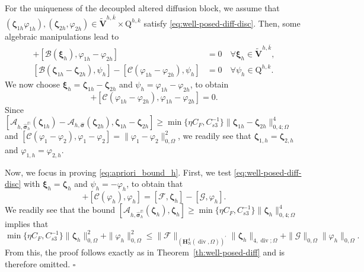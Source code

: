 \documentclass[fleqn,a4paper]{cas-sc}
\newcommand\vdiv{\mathop{\mathrm{div}}\nolimits}
\newcommand{\bxi}{\boldsymbol{\xi}}
\newcommand{\bzeta}{\boldsymbol{\zeta}}
\newcommand{\0}{\boldsymbol{0}}
\newcommand\cC{\mathcal{C}}
\newcommand\cG{\mathcal{G}}
\newcommand\cF{\mathcal{F}}
\newcommand\bV{\mathbf{V}}
\newcommand\rQ{\mathrm{Q}}
\newcommand\bH{\mathbf{H}}
\newcommand\bbPi{\mathbb{\Pi}}
\newcommand\bsigma{\boldsymbol{\sigma}}
\numberwithin{equation}{section}
\numberwithin{figure}{section}
\newenvironment{proof}{\noindent{\it Proof.}}{\hfill$\square$}
\begin{document}
\begin{proof}
    {For the uniqueness of the decoupled altered diffusion block, we assume that $(\bzeta_{1h} \varphi_{1h}), (\bzeta_{2h}, \varphi_{2h})\in \widetilde{\bV}^{h,\overline{k}}\times \rQ^{h,k}$ satisfy \eqref{eq:well-posed-diff-disc}. Then, some algebraic manipulations lead to
    \begin{align*}
        [\mathcal{A}_{h,\widehat{\bsigma}_h^\bbPi}(\bzeta_{1h}) - \mathcal{A}_{h,\widehat{\bsigma}_h^\bbPi}(\bzeta_{2h}), \bxi_h] + [\mathcal{B}(\bxi_h), \varphi_{1h} - \varphi_{2h}] &= 0 \quad \forall \bxi_h \in \widetilde{\bV}^{h,\overline{k}},\\ %
        [\mathcal{B}(\bzeta_{1h} - \bzeta_{2h}), \psi_h] - [\cC(\varphi_{1h} - \varphi_{2h}), \psi_h] &= 0 \quad \forall \psi_h \in \rQ^{h,k}. %
    \end{align*}
    We now choose $\bxi_h = \bzeta_{1h} - \bzeta_{2h}$ and $\psi_h = \varphi_{1h} - \varphi_{2h}$, to obtain
    \begin{equation*}
        [\mathcal{A}_{h,\widehat{\bsigma}_h^\bbPi}(\bzeta_{1h}) - \mathcal{A}_{h,\widehat{\bsigma}_h^\bbPi}(\bzeta_{2h}), \bzeta_{1h} - \bzeta_{2h}] + [\cC(\varphi_{1h} - \varphi_{2h}), \varphi_{1h} - \varphi_{2h}] = 0.
    \end{equation*}
    Since $[\mathcal{A}_{h,\widehat{\bsigma}_h^\bbPi}(\bzeta_{1h}) - \mathcal{A}_{h,\widehat{\bsigma}}(\bzeta_{2h}), \bzeta_{1h} - \bzeta_{2h}] \ge \min\{\eta C_F,C_{s3}^{-1}\} \|\bzeta_{1h} - \bzeta_{2h}\|_{0,4;\Omega}^4$ and $[\cC(\varphi_1 - \varphi_2), \varphi_1 - \varphi_2] = \|\varphi_1 - \varphi_2\|_{0,\Omega}^2$, we readily see that $\bzeta_{1,h} = \bzeta_{2,h}$ and $\varphi_{1,h} = \varphi_{2,h}$.}
    
    {Now, we focus in proving \eqref{eq:apriori_bound_h}. First, we test \eqref{eq:well-posed-diff-disc} with $\bxi_h = \bzeta_h$ and $\psi_h = -\varphi_h$, to obtain that
    \begin{equation*}
        [\mathcal{A}_{h,\widehat{\bsigma}_h^\bbPi}(\bzeta_h), \bzeta_h] + [\cC(\varphi_h), \varphi_h] = [\cF, \bzeta_h] - [\cG, \varphi_h].
    \end{equation*}
    We readily see that the bound $[\mathcal{A}_{h,\widehat{\bsigma}_h^\bbPi}(\bzeta_h), \bzeta_h] \ge \min\{\eta C_F,C_{s3}^{-1}\} \|\bzeta_h\|_{0,4;\Omega}^4$ implies that
    \begin{equation*}%
        \min\{\eta C_F,C_{s3}^{-1}\}  \|\bzeta_h\|_{0,\Omega}^2 + \|\varphi_h\|_{0, \Omega}^2 \le \|\cF\|_{(\bH^{4}_{\mathrm{N}}(\vdiv,\Omega))^\prime} \|\bzeta_h\|_{{{4,\vdiv;\Omega}}} + \|\cG\|_{0, \Omega} \|\varphi_h\|_{0, \Omega}.
    \end{equation*}
 From this, the proof follows exactly as in Theorem~\ref{th:well-posed-diff} and is therefore omitted.}
\end{proof}
\end{document}
